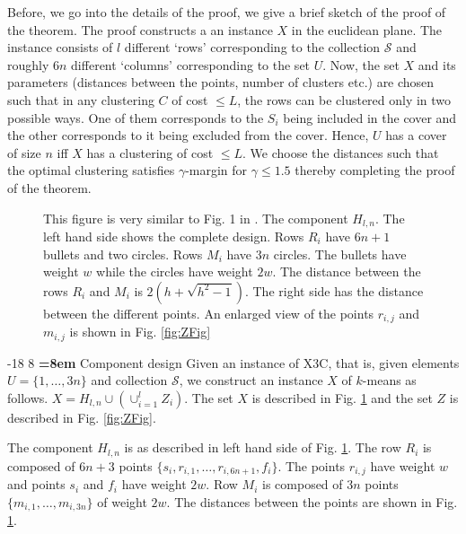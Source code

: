 \documentclass[orivec]{llncs}
\makeatletter
\newcommand{\mc}{\mathcal}
\renewcommand\subsubsection{\@startsection{subsubsection}{3}{\z@}%
   {-18\p@ \@plus -4\p@ \@minus -4\p@}%
   {8\p@ \@plus 4\p@ \@minus 4\p@}%
   {\normalfont\normalsize\bfseries\boldmath
   \rightskip=\z@ \@plus 8em \pretolerance=10000}}
\makeatother
\begin{document}
Before, we go into the details of the proof, we give a brief sketch of the proof of the theorem. The proof constructs a an instance $X$ in the euclidean plane. The instance consists of $l$ different `rows' corresponding to the collection $\mc S$ and roughly $6n$ different `columns' corresponding to the set $U$. Now, the set $X$ and its parameters (distances between the points, number of clusters etc.) are chosen such that in any clustering $C$ of cost $\le L$, the rows can be clustered only in two possible ways. One of them corresponds to the $S_i$ being included in the cover and the other corresponds to it being excluded from the cover. Hence, $U$ has a cover of size $n$ iff $X$ has a clustering of cost $\le L$. We choose the distances such that the optimal clustering satisfies $\gamma$-margin for $\gamma \le 1.5$ thereby completing the proof of the theorem. 
  
\begin{figure}

\caption{This figure is very similar to Fig. 1 in \cite{vattani2009hardness}. The component $H_{l,n}$. The left hand side shows the complete design. Rows $R_i$ have $6n+1$ bullets and two circles. Rows $M_i$ have $3n$ circles. The bullets have weight $w$ while the circles have weight $2w$. The distance between the rows $R_i$ and $M_i$ is $2(h+\sqrt{h^2-1})$. The right side has the distance between the different points. An enlarged view of the points $r_{i, j}$ and $m_{i,j}$ is shown in Fig. \ref{fig:ZFig}}
\label{fig:lowerBoundComponent}
\end{figure}

\subsubsection{Component design}
Given an instance of X3C, that is, given elements $U = \{1, \ldots, 3n\}$ and collection $\mc S$, we construct an instance $X$ of $k$-means as follows. $X = H_{l,n} \cup (\cup_{i=1}^l Z_i)$. The set $X$ is described in Fig. \ref{fig:lowerBoundComponent} and the set $Z$ is described in Fig. \ref{fig:ZFig}.

The component $H_{l,n}$ is as described in left hand side of Fig. \ref{fig:lowerBoundComponent}. The row $R_i$ is composed of $6n + 3$ points $\{s_i, r_{i, 1}, \ldots, r_{i, 6n+1}, f_i\}$. The points $r_{i, j}$ have weight $w$ and points $s_i$ and $f_i$ have weight $2w$. Row $M_i$ is composed of $3n$ points $\{m_{i,1}, \ldots, m_{i, 3n}\}$ of weight $2w$. The distances between the points are shown in Fig. \ref{fig:lowerBoundComponent}.
\end{document}
